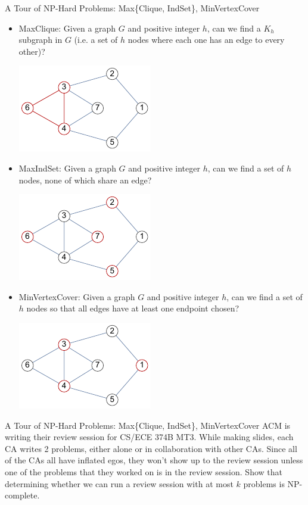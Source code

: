 \documentclass{beamer}
\begin{document}
\begin{frame}[t]{A Tour of NP-Hard Problems: Max\{Clique, IndSet\}, MinVertexCover}
    \begin{itemize}
        \item \alert{MaxClique}: Given a graph $G$ and positive integer $h$, can we find a $K_h$ subgraph in $G$ (i.e. a set of $h$ nodes where each one has an edge to every other)?
        \pause \begin{center}
            \includegraphics[width=0.22\linewidth]{clique.pdf}
        \end{center}
        \item \pause \alert{MaxIndSet}: Given a graph $G$ and positive integer $h$, can we find a set of $h$ nodes, none of which share an edge?
        \pause \begin{center}
            \includegraphics[width=.22\linewidth]{indset.pdf}
        \end{center}
        \item \pause \alert{MinVertexCover}: Given a graph $G$ and positive integer $h$, can we find a set of $h$ nodes so that all edges have at least one endpoint chosen?
        \pause \begin{center}
            \includegraphics[width=.22\linewidth]{vtxCover.pdf}
        \end{center}
        \end{itemize}
\end{frame}

\begin{frame}[t]{A Tour of NP-Hard Problems: Max\{Clique, IndSet\}, MinVertexCover}
    ACM is writing their review session for CS/ECE 374B MT3. While making slides, each CA writes 2 problems, either alone or in collaboration with other CAs. Since all of the CAs all have inflated egos, they won't show up to the review session unless one of the problems that they worked on is in the review session. Show that determining whether we can run a review session with at most $k$ problems is NP-complete.
\end{frame}
\end{document}
